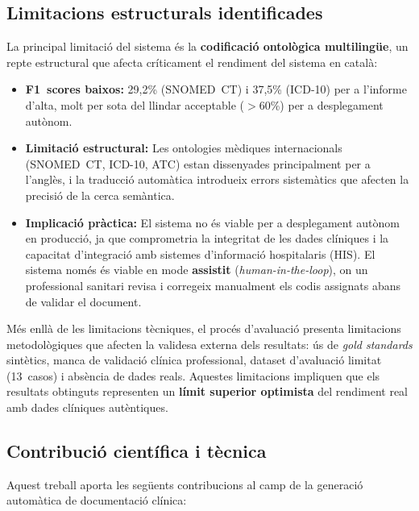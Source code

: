 \documentclass[CAT]{TFUOC}%
\begin{document}
\subsection{Limitacions estructurals identificades}

La principal limitació del sistema és la \textbf{codificació ontològica multilingüe}, un repte estructural que afecta críticament el rendiment del sistema en català:

\begin{itemize}
    \item \textbf{F1~scores baixos:} 29,2\% (SNOMED~CT) i 37,5\% (ICD-10) per a l'informe d'alta, molt per sota del llindar acceptable ($>$60\%) per a desplegament autònom.
    
    \item \textbf{Limitació estructural:} Les ontologies mèdiques internacionals (SNOMED~CT, ICD-10, ATC) estan dissenyades principalment per a l'anglès, i la traducció automàtica introdueix errors sistemàtics que afecten la precisió de la cerca semàntica.
    
    \item \textbf{Implicació pràctica:} El sistema no és viable per a desplegament autònom en producció, ja que comprometria la integritat de les dades clíniques i la capacitat d'integració amb sistemes d'informació hospitalaris (HIS). El sistema només és viable en mode \textbf{assistit} (\textit{human-in-the-loop}), on un professional sanitari revisa i corregeix manualment els codis assignats abans de validar el document.
\end{itemize}

Més enllà de les limitacions tècniques, el procés d'avaluació presenta limitacions metodològiques que afecten la validesa externa dels resultats: ús de \textit{gold standards} sintètics, manca de validació clínica professional, dataset d'avaluació limitat (13~casos) i absència de dades reals. Aquestes limitacions impliquen que els resultats obtinguts representen un \textbf{límit superior optimista} del rendiment real amb dades clíniques autèntiques.

\subsection{Contribució científica i tècnica}

Aquest treball aporta les següents contribucions al camp de la generació automàtica de documentació clínica:
\end{document}
